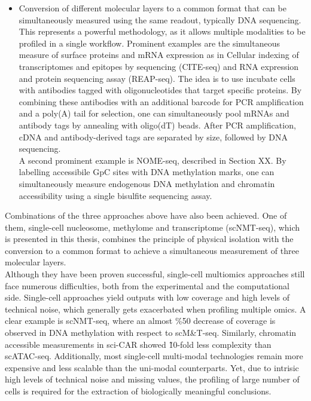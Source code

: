 \begin{itemize}
	\item Conversion of different molecular layers to a common format that can be simultaneously measured using the same readout, typically DNA sequencing. This represents a powerful methodology, as it allows multiple modalities to be profiled in a single workflow. Prominent examples are the simultaneous measure of surface proteins and mRNA expression as in Cellular indexing of transcriptomes and epitopes by sequencing (CITE-seq) and RNA expression and protein sequencing assay (REAP-seq). The idea is to use incubate cells with antibodies tagged with oligonucleotides that target specific proteins. By combining these antibodies with an additional barcode for PCR amplification and a poly(A) tail for selection, one can simultaneously pool mRNAs and antibody tags by annealing with oligo(dT) beads. After PCR amplification, cDNA and antibody-derived tags are separated by size, followed by DNA sequencing.\\
	A second prominent example is NOME-seq, described in Section XX. By labelling accessibile GpC sites with DNA methylation marks, one can simultaneously measure endogenous DNA methylation and chromatin accessibility using a single bisulfite sequencing assay.
\end{itemize}
	
Combinations of the three approaches above have also been achieved. One of them, single-cell nucleosome, methylome and transcriptome (scNMT-seq), which is presented in this thesis, combines the principle of physical isolation with the conversion to a common format to achieve a simultaneous measurement of three molecular layers.\\

Although they have been proven successful, single-cell multiomics approaches still face numerous difficulties, both from the experimental and the computational side. Single-cell approaches yield outputs with low coverage and high levels of technical noise, which generally gets exacerbated when profiling multiple omics. A clear example is scNMT-seq, where an almost \%50 decrease of coverage is observed in DNA methylation with respect to scM\&T-seq. Similarly, chromatin accessible measurements in sci-CAR showed \~10-fold less complexity than scATAC-seq. Additionally, most single-cell multi-modal technologies remain more expensive and less scalable than the uni-modal counterparts. Yet, due to intrisic high levels of technical noise and missing values, the profiling of large number of cells is required for the extraction of biologically meaningful conclusions.
